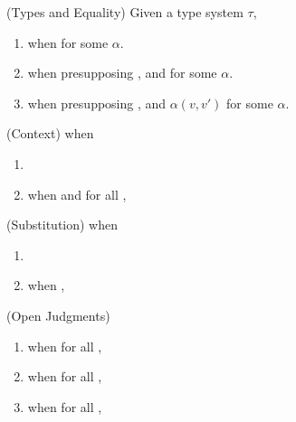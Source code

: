 

\begin{definition}(Types and Equality)
  Given a type system $\tau$, 
  \begin{enumerate}
    \item {} when  for some $\alpha$.
    \item {} when presupposing ,
       and  for some $\alpha$.
    \item {} when presupposing ,
       and $\alpha(v,v')$ for some $\alpha$.
  \end{enumerate}
\end{definition}

\begin{definition}(Context)
   when
  \begin{enumerate}
    \item \eqCtx{\cdot}{\cdot}
    \item {} when  and for all 
      , 
  \end{enumerate}
\end{definition}

\begin{definition}(Substitution)
   when
  \begin{enumerate}
    \item \eqInst{\cdot}{\cdot}{\cdot}
    \item {} when
      , 
  \end{enumerate}
\end{definition}

\begin{definition}(Open Judgments)
  \begin{enumerate}
    \item {} when for all , 
    \item {} when for all , 
    \item {} when for all , 
  \end{enumerate}
\end{definition}

